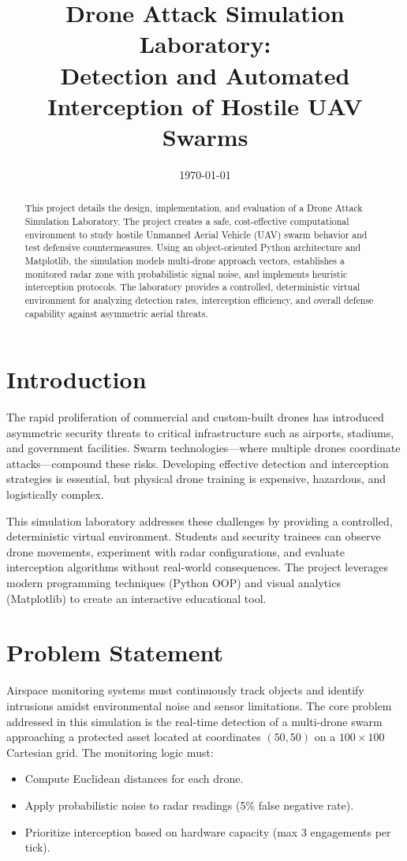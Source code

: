 \documentclass[11pt,a4paper]{article}
\title{\textbf{Drone Attack Simulation Laboratory:\\Detection and Automated Interception of Hostile UAV Swarms}}
\author{}
\date{\today}
\begin{document}
\maketitle

\begin{abstract}
This project details the design, implementation, and evaluation of a Drone Attack Simulation Laboratory. The project creates a safe, cost-effective computational environment to study hostile Unmanned Aerial Vehicle (UAV) swarm behavior and test defensive countermeasures. Using an object-oriented Python architecture and Matplotlib, the simulation models multi-drone approach vectors, establishes a monitored radar zone with probabilistic signal noise, and implements heuristic interception protocols. The laboratory provides a controlled, deterministic virtual environment for analyzing detection rates, interception efficiency, and overall defense capability against asymmetric aerial threats.
\end{abstract}

\section{Introduction}
The rapid proliferation of commercial and custom-built drones has introduced asymmetric security threats to critical infrastructure such as airports, stadiums, and government facilities. Swarm technologies—where multiple drones coordinate attacks—compound these risks. Developing effective detection and interception strategies is essential, but physical drone training is expensive, hazardous, and logistically complex. 

This simulation laboratory addresses these challenges by providing a controlled, deterministic virtual environment. Students and security trainees can observe drone movements, experiment with radar configurations, and evaluate interception algorithms without real-world consequences. The project leverages modern programming techniques (Python OOP) and visual analytics (Matplotlib) to create an interactive educational tool.

\section{Problem Statement}
Airspace monitoring systems must continuously track objects and identify intrusions amidst environmental noise and sensor limitations. The core problem addressed in this simulation is the real-time detection of a multi-drone swarm approaching a protected asset located at coordinates \((50,50)\) on a \(100 \times 100\) Cartesian grid. The monitoring logic must:
\begin{itemize}
    \item Compute Euclidean distances for each drone.
    \item Apply probabilistic noise to radar readings (5\% false negative rate).
    \item Prioritize interception based on hardware capacity (max 3 engagements per tick).
\end{itemize}
\end{document}
